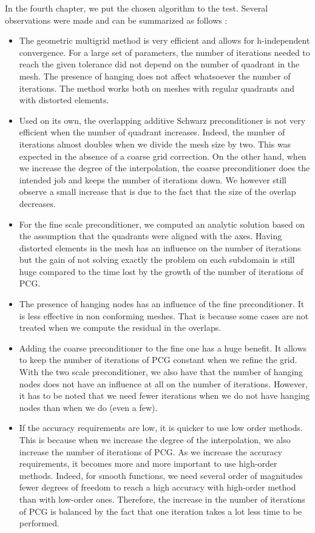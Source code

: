 In the fourth chapter, we put the chosen algorithm to the test. Several observations were made and can be summarized as follows : 

\begin{itemize}
\item The geometric multigrid method is very efficient and allows for h-independent convergence. For a large set of parameters, the number of iterations needed to reach the given tolerance did not depend on the number of quadrant in the mesh. The presence of hanging does not affect whatsoever the number of iterations. The method works both on meshes with regular quadrants and with distorted elements. 
\item Used on its own, the overlapping additive Schwarz preconditioner is not very efficient when the number of quadrant increases. Indeed, the number of iterations almost doubles when we divide the mesh size by two. This was expected in the absence of a coarse grid correction. On the other hand, when we increase the degree of the interpolation, the coarse preconditioner does the intended job and keeps the number of iterations down. We however still observe a small increase that is due to the fact that the size of the overlap decreases.
\item For the fine scale preconditioner, we computed an analytic solution based on the assumption that the quadrants were aligned with the axes. Having distorted elements in the mesh has an influence on the number of iterations but the gain of not solving exactly the problem on each subdomain is still huge compared to the time lost by the growth of the number of iterations of PCG.
\item The presence of hanging nodes has an influence of the fine preconditioner. It is less effective in non conforming meshes. That is because some cases are not treated when we compute the residual in the overlaps. 
\item Adding the coarse preconditioner to the fine one has a huge benefit. It allows to keep the number of iterations of PCG constant when we refine the grid. With the two scale preconditioner, we also have that the number of hanging nodes does not have an influence at all on the number of iterations. However, it has to be noted that we need fewer iterations when we do not have hanging nodes than when we do (even a few). 
\item If the accuracy requirements are low, it is quicker to use low order methods. This is because when we increase the degree of the interpolation, we also increase the number of iterations of PCG. As we increase the accuracy requirements, it becomes more and more important to use high-order methods. Indeed, for smooth functions, we need several order of magnitudes fewer degrees of freedom to reach a high accuracy with high-order method than with low-order ones. Therefore, the increase in the number of iterations of PCG is balanced by the fact that one iteration takes a lot less time to be performed. 
\end{itemize}


